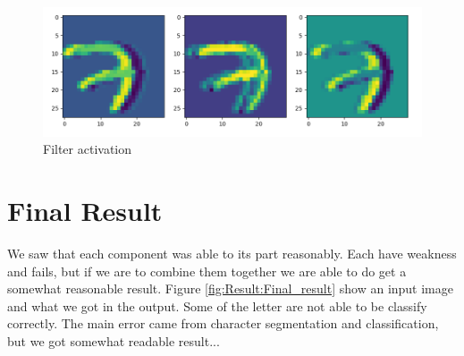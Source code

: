\documentclass[Report.tex]{subfiles}
\begin{document}
\begin{figure}[!htb]
\includegraphics[width=\textwidth]{res/filter_view.png}
\caption{Filter activation}
\label{fig_filter_view}
\end{figure}

\newpage
\section{Final Result}
We saw that each component was able to its part reasonably. Each have weakness and fails, but if we are to combine them together we are able to do get a somewhat reasonable result. Figure \ref{fig:Result:Final_result} show an input image and what we got in the output. Some of the letter are not able to be classify correctly. The main error came from character segmentation and classification, but we got somewhat readable result... 
\end{document}
